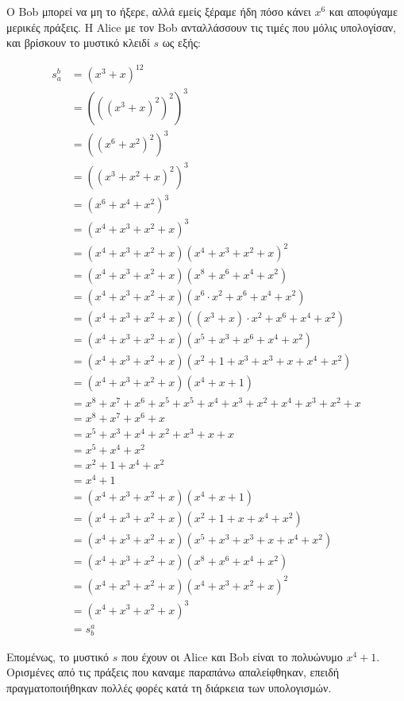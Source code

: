 \documentclass{article}
\begin{document}
Ο Bob μπορεί να μη το ήξερε, αλλά εμείς ξέραμε ήδη πόσο κάνει $x^6$ και αποφύγαμε μερικές πράξεις. Η Alice με τον Bob ανταλλάσσουν τις τιμές που μόλις υπολογίσαν, και βρίσκουν το μυστικό κλειδί $s$ ως εξής:

\begin{align*}
    s_a^b
    &= (x^3 + x)^12 \\
    &= (((x^3 + x)^2)^2)^3 \\
    &= ((x^6 + x^2)^2)^3 \\
    &= ((x^3 + x^2 + x)^2)^3 \\
    &= (x^6 + x^4 + x^2)^3 \\
    &= (x^4 + x^3 + x^2 + x)^3 \\
    &= (x^4 + x^3 + x^2 + x)(x^4 + x^3 + x^2 + x)^2 \\
    &= (x^4 + x^3 + x^2 + x)(x^8 + x^6 + x^4 + x^2) \\
    &= (x^4 + x^3 + x^2 + x)(x^6 \cdot x^2 + x^6 + x^4 + x^2) \\
    &= (x^4 + x^3 + x^2 + x)((x^3 + x) \cdot x^2 + x^6 + x^4 + x^2) \\
    &= (x^4 + x^3 + x^2 + x)(x^5 + x^3 + x^6 + x^4 + x^2) \\
    &= (x^4 + x^3 + x^2 + x)(x^2 + 1 + x^3 + x^3 + x + x^4 + x^2) \\
    &= (x^4 + x^3 + x^2 + x)(x^4 + x + 1) \\
    &= x^8 + x^7 + x^6 + x^5 + x^5 + x^4 + x^3 + x^2 + x^4 + x^3 + x^2 + x \\
    &= x^8 + x^7 + x^6 + x \\
    &= x^5 + x^3 + x^4 + x^2 + x^3 + x + x \\
    &= x^5 + x^4 + x^2 \\
    &= x^2 + 1 + x^4 + x^2 \\
    &= x^4 + 1 \\
    &= (x^4 + x^3 + x^2 + x)(x^4 + x + 1) \\
    &= (x^4 + x^3 + x^2 + x)(x^2 + 1 + x + x^4 + x^2) \\
    &= (x^4 + x^3 + x^2 + x)(x^5 + x^3 + x^3 + x + x^4 + x^2) \\
    &= (x^4 + x^3 + x^2 + x)(x^8 + x^6 + x^4 + x^2) \\
    &= (x^4 + x^3 + x^2 + x)(x^4 + x^3 + x^2 + x)^2 \\
    &= (x^4 + x^3 + x^2 + x)^3 \\
    &= s_b^a
\end{align*}

Επομένως, το μυστικό $s$ που έχουν οι Alice και Bob είναι το πολυώνυμο $x^4 + 1$. Ορισμένες από τις πράξεις που καναμε παραπάνω απαλείφθηκαν, επειδή πραγματοποιήθηκαν πολλές φορές κατά τη διάρκεια των υπολογισμών.
\end{document}
